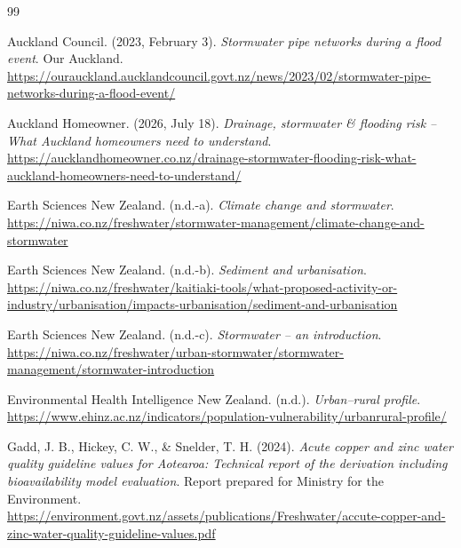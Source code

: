 \documentclass[11pt,a4paper]{article}
\newcommand{\todoref}[1]{\textcolor{red}{\textbf{[#1]}}}
\begin{document}
\clearpage
{}
\begin{thebibliography}{99}
\small
\setlength{\itemsep}{4pt}
\setlength{\parskip}{0pt}
\setlength{\parindent}{0pt}
\raggedright
\makeatletter
\renewcommand\@biblabel[1]{}
\makeatother

Auckland Council. (2023, February 3). \textit{Stormwater pipe networks during a flood event}. Our Auckland. \url{https://ourauckland.aucklandcouncil.govt.nz/news/2023/02/stormwater-pipe-networks-during-a-flood-event/}

Auckland Homeowner. (2026, July 18). \textit{Drainage, stormwater \& flooding risk -- What Auckland homeowners need to understand}. \url{https://aucklandhomeowner.co.nz/drainage-stormwater-flooding-risk-what-auckland-homeowners-need-to-understand/}


Earth Sciences New Zealand. (n.d.-a). \textit{Climate change and stormwater}. \url{https://niwa.co.nz/freshwater/stormwater-management/climate-change-and-stormwater}

Earth Sciences New Zealand. (n.d.-b). \textit{Sediment and urbanisation}. \url{https://niwa.co.nz/freshwater/kaitiaki-tools/what-proposed-activity-or-industry/urbanisation/impacts-urbanisation/sediment-and-urbanisation}

Earth Sciences New Zealand. (n.d.-c). \textit{Stormwater -- an introduction}. \url{https://niwa.co.nz/freshwater/urban-stormwater/stormwater-management/stormwater-introduction}

Environmental Health Intelligence New Zealand. (n.d.). \textit{Urban--rural profile}. \url{https://www.ehinz.ac.nz/indicators/population-vulnerability/urbanrural-profile/}

Gadd, J. B., Hickey, C. W., \& Snelder, T. H. (2024). \textit{Acute copper and zinc water quality guideline values for Aotearoa: Technical report of the derivation including bioavailability model evaluation}. Report prepared for Ministry for the Environment. \url{https://environment.govt.nz/assets/publications/Freshwater/accute-copper-and-zinc-water-quality-guideline-values.pdf}


\end{thebibliography}
\end{document}
